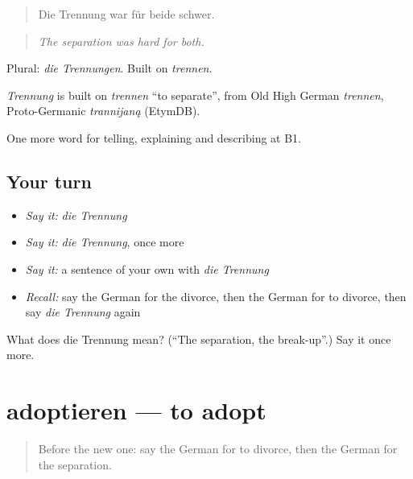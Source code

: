 \begin{quote}
Die Trennung war für beide schwer.
\end{quote}

\begin{quote}
\emph{The separation was hard for both.}
\end{quote}

Plural: \emph{die Trennungen}. Built on \emph{trennen}.

\begin{cousinweb}
\emph{Trennung} is built on \emph{trennen} \textquotedblleft{}to separate\textquotedblright{}, from Old High German \emph{trennen}, Proto-Germanic \emph{trannijaną} (EtymDB).
\end{cousinweb}

\begin{grammarlens}[title={What you've built}]
One more word for telling, explaining and describing at B1.
\end{grammarlens}

\subsection*{Your turn}
\begin{itemize}
\raggedright
  \item \emph{Say it:} \emph{die Trennung}
  \item \emph{Say it:} \emph{die Trennung}, once more
  \item \emph{Say it:} a sentence of your own with \emph{die Trennung}
  \item \emph{Recall:} say the German for the divorce, then the German for to divorce, then say \emph{die Trennung} again
\end{itemize}

\begin{tcolorbox}[breakable,colback=teal!4,colframe=teal!35!black,title={Before you move on}]
What does die Trennung mean? (\textquotedblleft{}The separation, the break-up\textquotedblright{}.) Say it once more.
\end{tcolorbox}
\section[adoptieren]{adoptieren — to adopt}

\label{lesson:GE-C300-adoptieren}



\begin{quote}
Before the new one: say the German for to divorce, then the German for the separation.
\end{quote}

